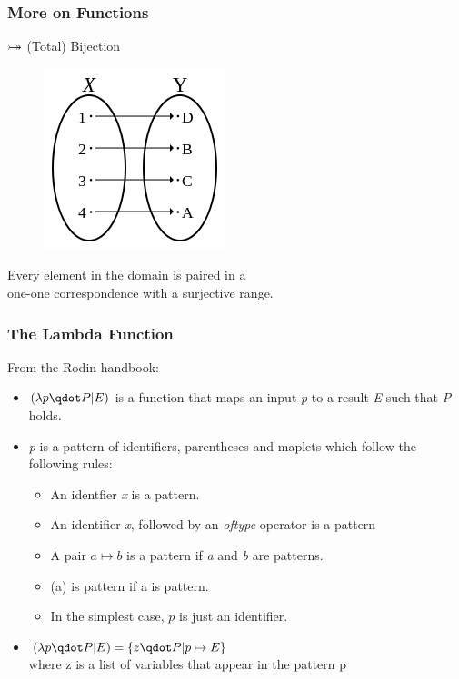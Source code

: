 \documentclass{beamer}
\begin{document}
\begin{frame}
\frametitle{More on Functions}

\begin{minipage}[t]{\textwidth}
\begin{center}
$\mathbin{ \rightarrowtail \mkern-18mu\twoheadrightarrow}$ (Total) Bijection
\begin{figure}
	\includegraphics[scale=0.5]{Bijection}
\end{figure}
Every element in the domain is paired in a\\ one-one correspondence with a surjective range.
\end{center}
\end{minipage}
\end{frame}

\begin{frame}
\frametitle{The Lambda Function}
From the Rodin handbook:
\begin{itemize}
\item $(\lambda  p \qdot  P | E )$ is a function that maps an input \emph{p} to a result \emph{E} such that \emph{P} holds.
\item \emph{p} is a pattern of identifiers, parentheses and maplets which follow the following rules:
\begin{itemize}
\item An identfier  \emph{x} is a pattern.
\item An identifier  \emph{x}, followed by an  \emph{oftype} operator is a pattern
\item A pair $a \mapsto b$ is a pattern if \emph{a} and \emph{b} are patterns.
\item  (a) is pattern if a is pattern.
\item In the simplest case, $p$ is just an identifier.
\end{itemize}
\item $(\lambda  p \qdot  P | E ) = \{z\qdot P | p \mapsto E\}$  \\where z is a list of
variables that appear in the pattern p
\end{itemize}

\end{frame}
\end{document}

